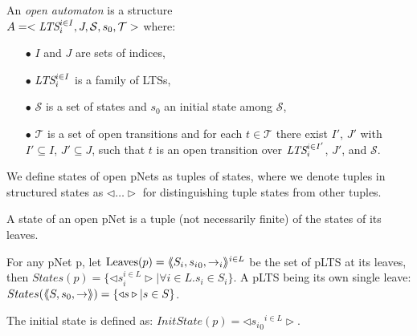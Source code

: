 \documentclass{llncs}
\begin{document}
\begin{definition}
	\label{def:open-automaton}
	An \emph{open automaton} is a structure\\ $A =
	<\LTS_i^{i\in I},J,\mathcal{S},s_0,\mathcal{T}>$ where:
	\begin{itemize}
		\item[$\bullet$]  $I$ and $J$ are  sets of indices,
		\item[$\bullet$]  $\LTS_i^{i\in I}$ is a family of LTSs,
		\item[$\bullet$]   $\mathcal{S}$ is a set of states and $s_0$ an initial state
		among $\mathcal{S}$,
		\item[$\bullet$] $\mathcal{T}$ is a set of open transitions and for each
		$t\in \mathcal{T}$ there exist $I'$, $J'$ with $I'\subseteq I$, $J'
		\subseteq J$, such that $t$ is an open transition over $\LTS_i^{i\in I'}$, $J'$,
		and  $\mathcal{S}$.
		
	\end{itemize}
\end{definition}
	

%

We define states of open pNets as tuples of states, where we denote tuples
in structured states as $\triangleleft\ldots\triangleright$ for distinguishing tuple 
states from other tuples.
\begin{definition}\label{def-states}
  A state of an open pNet is a tuple (not necessarily finite) of the
  states of its leaves.

  For any pNet p, let $\operatorname{Leaves}(p) = \langle\hspace{-0.58ex}\langle S_i,{s_i}_0, \to_i\rangle\hspace{-0.58ex}\rangle^{i \in L}$ be 
  the set of pLTS at its leaves,
  then $States(p) = \{\triangleleft s_i^{i\in L}
  \triangleright| \forall i\in L. s_i \in S_i\}$.
A pLTS being its own single leave:
  $States(\langle\hspace{-0.58ex}\langle S,s_0, \to\rangle\hspace{-0.58ex}\rangle) = \{\triangleleft s \triangleright| s \in S\}$.

The initial state is defined as:
$InitState(p) = \triangleleft {{s_i}_0}^{i\in L}  \triangleright$.
\end{definition}
\end{document}
